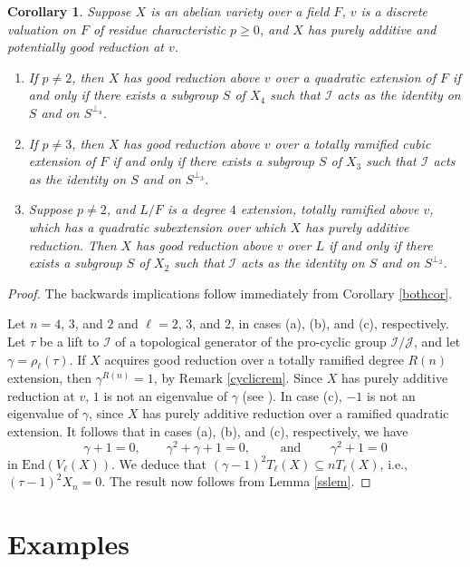 \documentclass{amsart}
\def\End{\mathrm{End}}
\def\I{{\mathcal I}}
\def\J{{\mathcal J}}
\newtheorem{cor}[thm]{Corollary}
\theoremstyle{definition}
\begin{document}
\begin{cor}
\label{paddcor}
Suppose 
$X$ is an abelian variety over a field $F$,  
$v$ is a discrete valuation on $F$ of residue characteristic 
$p \ge 0$, and $X$ has purely additive and  
potentially good reduction at $v$. 
\begin{enumerate}
\item[(a)] 
If $p \ne 2$, then $X$ has good reduction above $v$ over a quadratic 
extension of $F$ if and only if 
there exists a subgroup $S$ of $X_4$ such 
that $\I$ acts as the identity on $S$ and on $S^{\perp_4}$.
\item[(b)] If $p \ne 3$, 
then $X$ has good reduction above $v$ over a totally ramified cubic
extension of $F$ if and only if 
there exists a subgroup $S$ of $X_3$ such 
that $\I$ acts as the identity on $S$ and on $S^{\perp_3}$.
\item[(c)] Suppose $p \ne 2$, and
$L/F$ is a degree $4$ extension, 
totally ramified above $v$, 
which has a quadratic subextension over which $X$ has purely
additive reduction.  
Then $X$ has good reduction above $v$ over $L$ if and only if 
there exists a subgroup $S$ of $X_2$ such 
that $\I$ acts as the identity on $S$ and on $S^{\perp_2}$.
\end{enumerate}
\end{cor}

\begin{proof}
The backwards implications follow immediately from 
Corollary \ref{bothcor}.

Let $n = 4$, $3$, and $2$ and $\ell = 2$, $3$, and $2$, 
in cases (a), (b), and (c), respectively. 
Let $\tau$ be a lift to $\I$ of a topological 
generator of the pro-cyclic group $\I/\J$, and let 
$\gamma = \rho_{\ell}(\tau)$.
If $X$ acquires good reduction over a totally ramified degree $R(n)$
extension, then $\gamma^{R(n)} = 1$, by Remark \ref{cyclicrem}. 
Since $X$ has purely additive reduction
at $v$, $1$ is not an eigenvalue of $\gamma$ (see \cite{LenstraOort}).
In case (c), $-1$ is not an eigenvalue of $\gamma$, since $X$
has purely additive reduction over a ramified quadratic extension.
It follows that in cases (a), (b), and (c), respectively,
we have
$$\gamma+1 = 0, \qquad \gamma^2+\gamma+1=0, \qquad 
{\text{ and }}\qquad \gamma^2+1=0$$
in $\End(V_\ell(X))$.
We deduce that $(\gamma-1)^2T_{\ell}(X) \subseteq nT_{\ell}(X)$, i.e.,
$(\tau-1)^2X_n = 0$.
The result now follows from Lemma \ref{sslem}.
\end{proof}

\section{Examples}
\label{exssect}
\end{document}
